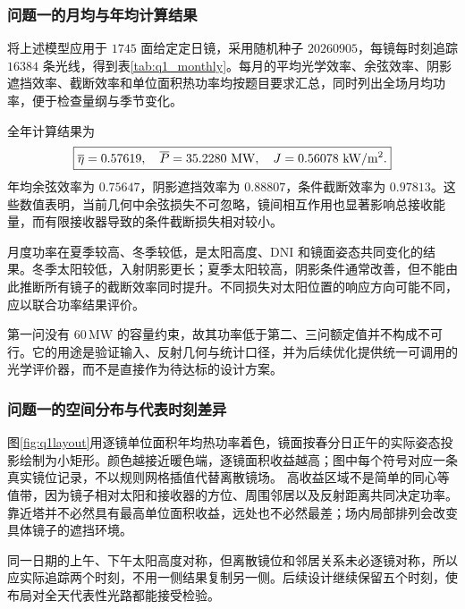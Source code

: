 \subsubsection{问题一的月均与年均计算结果}
将上述模型应用于 $1745$ 面给定定日镜，采用随机种子 $20260905$，每镜每时刻追踪 $16384$ 条光线，得到表\ref{tab:q1_monthly}。每月的平均光学效率、余弦效率、阴影遮挡效率、截断效率和单位面积热功率均按题目要求汇总，同时列出全场月均功率，便于检查量纲与季节变化。

全年计算结果为
\begin{equation}
\boxed{\mean\eta=0.57619,\quad\mean P=35.2280\ \mathrm{MW},\quad
J=0.56078\ \unitp.}
\end{equation}
年均余弦效率为 $0.75647$，阴影遮挡效率为 $0.88807$，条件截断效率为 $0.97813$。这些数值表明，当前几何中余弦损失不可忽略，镜间相互作用也显著影响总接收能量，而有限接收器导致的条件截断损失相对较小。

月度功率在夏季较高、冬季较低，是太阳高度、DNI 和镜面姿态共同变化的结果。冬季太阳较低，入射阴影更长；夏季太阳较高，阴影条件通常改善，但不能由此推断所有镜子的截断效率同时提升。不同损失对太阳位置的响应方向可能不同，应以联合功率结果评价。

第一问没有 $60\,\mathrm{MW}$ 的容量约束，故其功率低于第二、三问额定值并不构成不可行。它的用途是验证输入、反射几何与统计口径，并为后续优化提供统一可调用的光学评价器，而不是直接作为待达标的设计方案。

\pagepart
\subsubsection{问题一的空间分布与代表时刻差异}
图\ref{fig:q1layout}用逐镜单位面积年均热功率着色，镜面按春分日正午的实际姿态投影绘制为小矩形。颜色越接近暖色端，逐镜面积收益越高；图中每个符号对应一条真实镜位记录，不以规则网格插值代替离散镜场。
高收益区域不是简单的同心等值带，因为镜子相对太阳和接收器的方位、周围邻居以及反射距离共同决定功率。靠近塔并不必然具有最高单位面积收益，远处也不必然最差；场内局部排列会改变具体镜子的遮挡环境。

同一日期的上午、下午太阳高度对称，但离散镜位和邻居关系未必逐镜对称，所以应实际追踪两个时刻，不用一侧结果复制另一侧。后续设计继续保留五个时刻，使布局对全天代表性光路都能接受检验。

\pagepart

